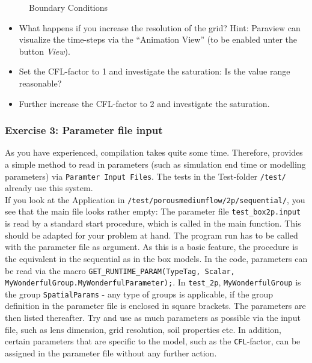 \begin{figure}[ht]
\centering
{}
\caption{Boundary Conditions}\label{tutorial-sequential:ex2_BC}
\end{figure}

\begin{itemize}
 \item What happens if you increase the resolution of the grid? Hint: Paraview
 can visualize the time-steps via the ``Animation View'' (to be enabled unter the button \textit{View}).
 \item Set the CFL-factor to 1 and investigate the saturation: Is the value range reasonable?
 \item Further increase the CFL-factor to 2 and investigate the saturation.
\end{itemize}

\subsubsection{Exercise 3: Parameter file input}
As you have experienced, compilation takes quite some time. Therefore, \Dumux
provides a simple method to read in parameters (such as simulation end time or
modelling parameters) via \texttt{Paramter Input Files}. The tests in the Test-folder
\texttt{/test/} already use this system.\\
If you look at the Application in \texttt{/test/porousmediumflow/2p/sequential/}, you see that
the main file looks rather empty: The parameter file \texttt{test\_box2p.input}
is read by a standard start procedure, which is called in the main function.
This should be adapted for your problem at hand. The program run has to be
called with the parameter file as argument. As this is a basic \Dumux feature,
the procedure is the equivalent in the sequential as in the box models.
In the code, parameters can be read via the macro
\texttt{GET\_RUNTIME\_PARAM(TypeTag, Scalar, MyWonderfulGroup.MyWonderfulParameter);}.
In \texttt{test\_2p}, \texttt{MyWonderfulGroup} is the group \texttt{SpatialParams}
- any type of groups is applicable, if the group definition in the parameter file
is enclosed in square brackets. The parameters are then listed thereafter.
Try and use as much parameters as possible via the input file, such as lens
dimension, grid resolution, soil properties etc. In addition, certain parameters
that are specific to the model, such as the \texttt{CFL}-factor, can be assigned
in the parameter file without any further action.

